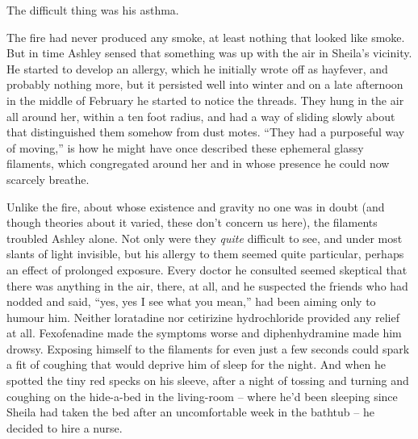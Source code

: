 \documentclass[
]{article}
\begin{document}
The difficult thing was his asthma.

The fire had never produced any smoke, at least nothing that looked like
smoke. But in time Ashley sensed that something was up with the air in
Sheila's vicinity. He started to develop an allergy, which he initially
wrote off as hayfever, and probably nothing more, but it persisted well
into winter and on a late afternoon in the middle of February he started
to notice the threads. They hung in the air all around her, within a ten
foot radius, and had a way of sliding slowly about that distinguished
them somehow from dust motes. ``They had a purposeful way of moving,''
is how he might have once described these ephemeral glassy filaments,
which congregated around her and in whose presence he could now scarcely
breathe.

Unlike the fire, about whose existence and gravity no one was in doubt
(and though theories about it varied, these don't concern us here), the
filaments troubled Ashley alone. Not only were they \emph{quite}
difficult to see, and under most slants of light invisible, but his
allergy to them seemed quite particular, perhaps an effect of prolonged
exposure. Every doctor he consulted seemed skeptical that there was
anything in the air, there, at all, and he suspected the friends who had
nodded and said, ``yes, yes I see what you mean,'' had been aiming only
to humour him. Neither loratadine nor cetirizine hydrochloride provided
any relief at all. Fexofenadine made the symptoms worse and
diphenhydramine made him drowsy. Exposing himself to the filaments for
even just a few seconds could spark a fit of coughing that would deprive
him of sleep for the night. And when he spotted the tiny red specks on
his sleeve, after a night of tossing and turning and coughing on the
hide-a-bed in the living-room -- where he'd been sleeping since Sheila
had taken the bed after an uncomfortable week in the bathtub -- he
decided to hire a nurse.
\end{document}

